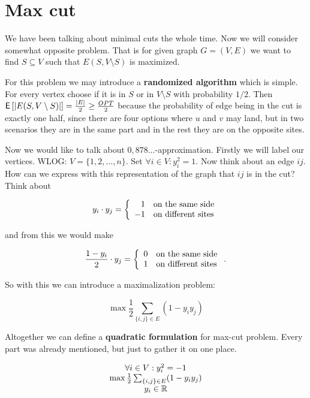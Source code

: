 \chapter{Max cut}

We have been talking about minimal cuts the whole time. Now we will consider somewhat opposite problem. That is for given graph $G = (V,E)$ we want to find $S \subseteq V$ such that $E(S, V \setminus S)$ is maximized.

For this problem we may introduce a \textbf{randomized algorithm} which is simple. For every vertex choose if it is in $S$ or in $V \setminus S$ with probability $1/2$. Then $\operatorname{\textsf{E}\,} [|E(S, V \setminus S)|] = \frac{|E|}{2} \geq \frac{OPT}{2}$ because the probability of edge being in the cut is exactly one half, since there are four options where $u$ and $v$ may land, but in two scenarios they are in the same part and in the rest they are on the opposite sites.

Now we would like to talk about $0,878\dots$-approximation. Firstly we will label our vertices. WLOG: $V = \{1, 2, \dots, n\}$. Set $\forall i \in V: y_{i}^2 =1$. Now think about an edge $ij$. How can we express with this representation of the graph that $ij$ is in the cut? Think about

$$
y_{i} \cdot y_{j} = \left\{
\begin{array}{r l}
	1 & \text{on the same side} \\
	-1 & \text{on different sites}
\end{array}
\right.
$$

and from this we would make

$$
\frac{1 - y_{i}}{2} \cdot y_{j} = \left\{
\begin{array}{r l}
	0 & \text{on the same side} \\
	1 & \text{on different sites}
\end{array}
\right..
$$

So with this we can introduce a maximalization problem:

$$
\max \frac{1}{2} \sum_{\{i,j\} \in E} (1 - y_i y_j)
$$

Altogether we can define a \textbf{quadratic formulation} for max-cut problem. Every part was already mentioned, but just to gather it on one place.

$$
\begin{array}{c}
	\forall i \in V: y_{i}^2 = -1 \\
	\max \frac{1}{2} \sum_{\{i,j\} \in E} (1 - y_i y_j) \\
	y_{i} \in \mathbb{R}
\end{array}
$$

